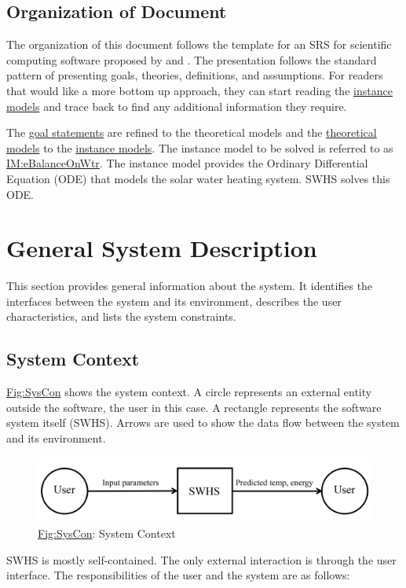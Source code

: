 \documentclass[12pt]{article}
\begin{document}
\subsection{Organization of Document}
\label{Sec:DocOrg}
The organization of this document follows the template for an SRS for scientific computing software proposed by \cite{koothoor2013} and \cite{smithLai2005}. The presentation follows the standard pattern of presenting goals, theories, definitions, and assumptions. For readers that would like a more bottom up approach, they can start reading the \hyperref[Sec:IMs]{instance models} and trace back to find any additional information they require.

The \hyperref[Sec:GoalStmt]{goal statements} are refined to the theoretical models and the \hyperref[Sec:TMs]{theoretical models} to the \hyperref[Sec:IMs]{instance models}. The instance model to be solved is referred to as \hyperref[IM:eBalanceOnWtr]{IM:eBalanceOnWtr}. The instance model provides the Ordinary Differential Equation (ODE) that models the solar water heating system. SWHS solves this ODE.

\section{General System Description}
\label{Sec:GenSysDesc}
This section provides general information about the system. It identifies the interfaces between the system and its environment, describes the user characteristics, and lists the system constraints.

\subsection{System Context}
\label{Sec:SysContext}
\hyperref[Figure:SysCon]{Fig:SysCon} shows the system context. A circle represents an external entity outside the software, the user in this case. A rectangle represents the software system itself (SWHS). Arrows are used to show the data flow between the system and its environment.

\begin{figure}
\begin{center}
\includegraphics[width=\textwidth]{../../../../datafiles/swhs/SystemContextFigure.png}
\caption{\hyperref[Figure:SysCon]{Fig:SysCon}: System Context}
\label{Figure:SysCon}
\end{center}
\end{figure}
SWHS is mostly self-contained. The only external interaction is through the user interface. The responsibilities of the user and the system are as follows:
\end{document}
